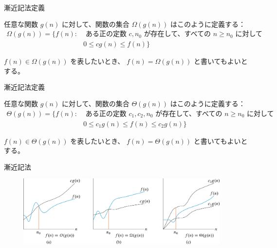 \documentclass[unicode,11pt,aspectratio=169,notes]{beamer} %
\begin{document}
\begin{frame}{漸近記法}{定義}
  \begin{definition}
    任意な関数 $g(n)$ に対して、関数の集合 $\Omega(g(n))$ はこのように定義する：
    \begin{align*}
      \Omega(g(n)) = \{
        f(n) : & \text{ ある正の定数 } c, n_0 \text{ が存在して、すべての }
        n \geq n_0 \text{ に対して } \\
        & 0 \leq cg(n) \leq f(n)
      \}
    \end{align*}
  \end{definition}
  
  $f(n) \in \Omega(g(n))$ を表したいとき、 $f(n) = \Omega(g(n))$ と書いてもよいとする。
\end{frame}

\begin{frame}{漸近記法}{定義}
  \begin{definition}
    任意な関数 $g(n)$ に対して、関数の集合 $\Theta(g(n))$ はこのように定義する：
    \begin{align*}
      \Theta(g(n)) = \{
        f(n) : & \text{ ある正の定数 } c_1, c_2, n_0 \text{ が存在して、すべての }
        n \geq n_0 \text{ に対して } \\
        & 0 \leq c_1g(n) \leq f(n) \leq c_2g(n)
      \}
    \end{align*}
  \end{definition}
  
  $f(n) \in \Theta(g(n))$ を表したいとき、 $f(n) = \Theta(g(n))$ と書いてもよいとする。
\end{frame}

\begin{frame}{漸近記法}
  \begin{figure}
    \includegraphics[width=0.95\textwidth]{resources/fig03.02}
  \end{figure}
\end{frame}
\end{document}
